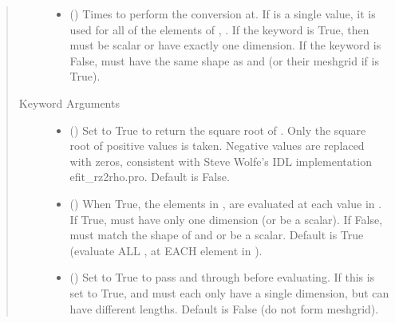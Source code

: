 \documentclass[letterpaper,10pt,english]{sphinxmanual}
\begin{document}
\begin{fulllineitems}
\begin{fulllineitems}
\begin{quote}
\begin{description}
\begin{itemize}
\item {} 
 () \textendash{} Times to perform the conversion at.
If  is a single value, it is used for all of the elements of
, . If the  keyword is True, then  must be
scalar or have exactly one dimension. If the  keyword is
False,  must have the same shape as  and  (or their
meshgrid if  is True).

\end{itemize}

\item[{Keyword Arguments}] \leavevmode\begin{itemize}
\item {} 
 () \textendash{} Set to True to return the square root of .
Only the square root of positive values is taken. Negative
values are replaced with zeros, consistent with Steve Wolfe’s
IDL implementation efit\_rz2rho.pro. Default is False.

\item {} 
 () \textendash{} When True, the elements in ,  are evaluated
at each value in . If True,  must have only one dimension
(or be a scalar). If False,  must match the shape of  and
 or be a scalar. Default is True (evaluate ALL ,  at
EACH element in ).

\item {} 
 () \textendash{} Set to True to pass  and  through
 before evaluating. If this is set to
True,  and  must each only have a single dimension, but
can have different lengths. Default is False (do not form
meshgrid).


\end{itemize}
\end{description}
\end{quote}
\end{fulllineitems}
\end{fulllineitems}
\end{document}
